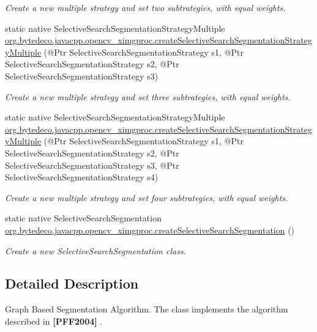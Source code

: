 \begin{DoxyCompactItemize}
\begin{DoxyCompactList}\small\item\em Create a new multiple strategy and set two subtrategies, with equal weights. \end{DoxyCompactList}\item 
static native Selective\+Search\+Segmentation\+Strategy\+Multiple \hyperlink{group__ximgproc__segmentation_ga83a457ff4067681d6ea93cf51b584b9d}{org.\+bytedeco.\+javacpp.\+opencv\+\_\+ximgproc.\+create\+Selective\+Search\+Segmentation\+Strategy\+Multiple} (@Ptr Selective\+Search\+Segmentation\+Strategy s1, @Ptr Selective\+Search\+Segmentation\+Strategy s2, @Ptr Selective\+Search\+Segmentation\+Strategy s3)
\begin{DoxyCompactList}\small\item\em Create a new multiple strategy and set three subtrategies, with equal weights. \end{DoxyCompactList}\item 
static native Selective\+Search\+Segmentation\+Strategy\+Multiple \hyperlink{group__ximgproc__segmentation_ga0c5302ec3882ad988a84158bc91186e1}{org.\+bytedeco.\+javacpp.\+opencv\+\_\+ximgproc.\+create\+Selective\+Search\+Segmentation\+Strategy\+Multiple} (@Ptr Selective\+Search\+Segmentation\+Strategy s1, @Ptr Selective\+Search\+Segmentation\+Strategy s2, @Ptr Selective\+Search\+Segmentation\+Strategy s3, @Ptr Selective\+Search\+Segmentation\+Strategy s4)
\begin{DoxyCompactList}\small\item\em Create a new multiple strategy and set four subtrategies, with equal weights. \end{DoxyCompactList}\item 
\mbox{\label{group__ximgproc__segmentation_gadfa823f2a25d59aaf55b7e0ce50ca67a}} 
static native Selective\+Search\+Segmentation \hyperlink{group__ximgproc__segmentation_gadfa823f2a25d59aaf55b7e0ce50ca67a}{org.\+bytedeco.\+javacpp.\+opencv\+\_\+ximgproc.\+create\+Selective\+Search\+Segmentation} ()
\begin{DoxyCompactList}\small\item\em Create a new Selective\+Search\+Segmentation class. \end{DoxyCompactList}\end{DoxyCompactItemize}


\subsection{Detailed Description}
Graph Based Segmentation Algorithm. The class implements the algorithm described in {\bfseries [P\+F\+F2004]} . 


